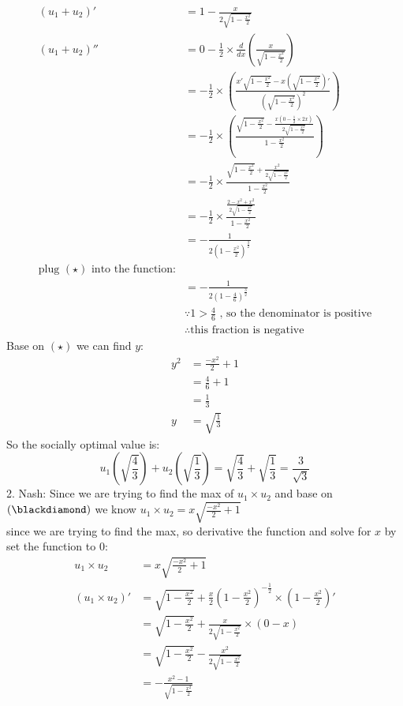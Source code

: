 \documentclass{article}
\begin{document}
\begin{align*}
(u_1 + u_2)' &= 1 - \frac{x}{2\sqrt{1 - \frac{x^2}{2}}}\\
(u_1 + u_2)'' & = 0 - \frac{1}{2} \times \frac{d}{dx}\left(\frac{x}{\sqrt{1 - \frac{x^2}{2}}}\right)\\
&= -\frac{1}{2} \times \left(\frac{x'\sqrt{1 - \frac{x^2}{2}} - x\left(\sqrt{1 - \frac{x^2}{2}}\right)'}{\left(\sqrt{1 - \frac{x^2}{2}}\right)^2}\right)\\
&= -\frac{1}{2} \times \left(\frac{\sqrt{1 - \frac{x^2}{2}} - \frac{x\left( 0 - \frac{1}{2} \times 2x \right)}{2\sqrt{1 - \frac{x^2}{2}}}}{1 - \frac{x^2}{2}}\right)\\
&= -\frac{1}{2} \times \frac{\sqrt{1 - \frac{x^2}{2}} + \frac{x^2}{2\sqrt{1 - \frac{x^2}{2}}}}{1 - \frac{x^2}{2}}\\
&= -\frac{1}{2} \times\frac{\frac{2 - x^2 + x^2}{2\sqrt{1 - \frac{x^2}{2}}}}{1 - \frac{x^2}{2}}\\
&= -\frac{1}{2\left(1 - \frac{x^2}{2}\right)^{\frac{3}{2}}}\\
\text{plug $(\star)$ into the function:}\\
&= -\frac{1}{2\left(1 - \frac{4}{6}\right)^{\frac{3}{2}}}\\
&\because 1 > \frac{4}{6} \text{ , so the denominator is positive}\\
&\therefore \text{this fraction is negative}
\end{align*}
Base on $(\star)$ we can find $y$:
\begin{align*}
y^2 &= \frac{-x^2}{2} + 1\\
&= \frac{4}{6} + 1\\
&= \frac{1}{3}\\
y &= \sqrt{\frac{1}{3}}
\end{align*}
So the socially optimal value is:
$$u_1\left(\sqrt{\frac{4}{3}}\right) + u_2\left(\sqrt{\frac{1}{3}}\right) = \sqrt{\frac{4}{3}} + \sqrt{\frac{1}{3}} = \frac{3}{\sqrt{3}}$$
2. Nash:
Since we are trying to find the max of $u_1 \times u_2$ and base on $(\blackdiamond)$ we know $u_1 \times u_2 = x \sqrt{\frac{-x^2}{2} + 1}$\\
since we are trying to find the max, so derivative the function and solve for $x$ by set the function to 0:
\begin{align*}
u_1 \times u_2 &= x \sqrt{\frac{-x^2}{2} + 1}\\
(u_1 \times u_2)' &= \sqrt{1-\frac{x^2}{2}} + \frac{x}{2} \left(1 - \frac{x^2}{2}\right)^{-\frac{1}{2}} \times \left(1-\frac{x^2}{2}\right)'\\
&= \sqrt{1-\frac{x^2}{2}} + \frac{x}{2\sqrt{1 - \frac{x^2}{2}}} \times (0 - x)\\
&= \sqrt{1-\frac{x^2}{2}} - \frac{x^2}{2\sqrt{1 - \frac{x^2}{2}}}\\
&= -\frac{x^2 - 1}{\sqrt{1 - \frac{x^2}{2}}}
\end{align*} 
\end{document}
